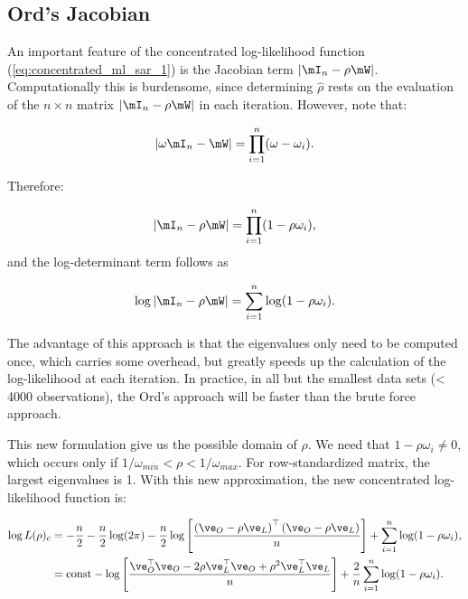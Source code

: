 \documentclass[english,12pt]{book}\usepackage[]{graphicx}\usepackage[]{xcolor}
\begin{document}
\subsection{Ord's Jacobian}

An important feature of the concentrated log-likelihood function (\ref{eq:concentrated_ml_sar_1}) is the Jacobian term $\left|\mI_n - \rho\mW\right|$. Computationally this is burdensome, since determining $\widehat{\rho}$ rests on the evaluation of the $n\times n$ matrix $\left|\mI_n - \rho\mW\right|$ in each iteration. However, \cite{ord1975estimation} note that:

\begin{equation*}
	\left|\omega\mI_n -\mW\right|=\prod_{i=1}^n(\omega-\omega_i).
\end{equation*}	

Therefore:

\begin{equation*}
\left|\mI_n -\rho\mW\right|=\prod_{i=1}^n(1-\rho\omega_i),
\end{equation*}	
%
and the log-determinant term follows as

\begin{equation}\label{eq:Ord-determinant}
\log\left|\mI_n -\rho\mW\right|=\sum_{i=1}^n\log(1 - \rho\omega_i).
\end{equation}

The advantage of this approach is that the eigenvalues only need to be computed once, which carries some overhead, but greatly speeds up the calculation of the log-likelihood at each iteration. In practice, in all but the smallest data sets (< 4000 observations), the Ord's approach will be faster than the brute force approach. 

This new formulation give us the possible domain of $\rho$. We need that $1 - \rho \omega_i \neq 0$, which occurs only if $1/\omega_{min} < \rho < 1/\omega_{max}$. For row-standardized matrix, the largest eigenvalues is 1. With this new approximation,  the new concentrated log-likelihood function is:

\begin{equation}\label{eq:concentrated_ml_sar_2}
  \begin{aligned}
\log L(\rho)_c & =-\frac{n}{2}-\frac{n}{2}\log(2\pi) - \frac{n}{2}\log\left[\frac{\left(\ve_O - \rho\ve_L\right)^\top\left(\ve_O - \rho\ve_L\right)}{n}\right] + \sum_{i=1}^n\log(1 - \rho\omega_i), \\
& = \mbox{const}- \log\left[\frac{\ve_O^\top\ve_O - 2\rho\ve_L^\top\ve_O + \rho^2 \ve_L^\top\ve_L}{n}\right] + \frac{2}{n}\sum_{i=1}^n\log(1 - \rho\omega_i).
  \end{aligned}
\end{equation}	
\end{document}
